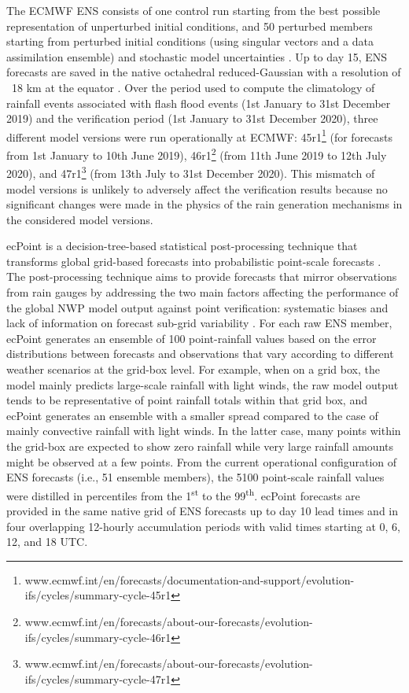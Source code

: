 \documentclass[techmemo]{ecmwfrep}%
\begin{document}
The ECMWF ENS consists of one control run starting from the best possible representation of unperturbed initial conditions, and 50 perturbed members starting from perturbed initial conditions (using singular vectors and a data assimilation ensemble) and stochastic model uncertainties \citep{Buizza2019}. Up to day 15, ENS forecasts are saved in the native octahedral reduced-Gaussian with a resolution of ~18 km at the equator \citep{Owens2018}. Over the period used to compute the climatology of rainfall events associated with flash flood events (1st January to 31st December 2019) and the verification period (1st January to 31st December 2020), three different model versions were run operationally at ECMWF: 45r1\footnote{www.ecmwf.int/en/forecasts/documentation-and-support/evolution-ifs/cycles/summary-cycle-45r1}  (for forecasts from 1st January to 10th June 2019), 46r1\footnote{www.ecmwf.int/en/forecasts/about-our-forecasts/evolution-ifs/cycles/summary-cycle-46r1}  (from 11th June 2019 to 12th July 2020), and 47r1\footnote{www.ecmwf.int/en/forecasts/about-our-forecasts/evolution-ifs/cycles/summary-cycle-47r1}  (from 13th July to 31st December 2020). This mismatch of model versions is unlikely to adversely affect the verification results because no significant changes were made in the physics of the rain generation mechanisms in the considered model versions.

ecPoint is a decision-tree-based statistical post-processing technique that transforms global grid-based forecasts into probabilistic point-scale forecasts \citep{Hewson2021}. The post-processing technique aims to provide forecasts that mirror observations from rain gauges by addressing the two main factors affecting the performance of the global NWP model output against point verification: systematic biases \citep{Lavers2021} and lack of information on forecast sub-grid variability \citep{Gober2008}. For each raw ENS member, ecPoint generates an ensemble of 100 point-rainfall values based on the error distributions between forecasts and observations that vary according to different weather scenarios at the grid-box level. For example, when on a grid box, the model mainly predicts large-scale rainfall with light winds, the raw model output tends to be representative of point rainfall totals within that grid box, and ecPoint generates an ensemble with a smaller spread compared to the case of mainly convective rainfall with light winds. In the latter case, many points within the grid-box are expected to show zero rainfall while very large rainfall amounts might be observed at a few points. From the current operational configuration of ENS forecasts (i.e., 51 ensemble members), the 5100 point-scale rainfall values were distilled in percentiles from the 1\textsuperscript{st} to the 99\textsuperscript{th}. ecPoint forecasts are provided in the same native grid of ENS forecasts up to day 10 lead times and in four overlapping 12-hourly accumulation periods with valid times starting at 0, 6, 12, and 18 UTC.
\end{document}

